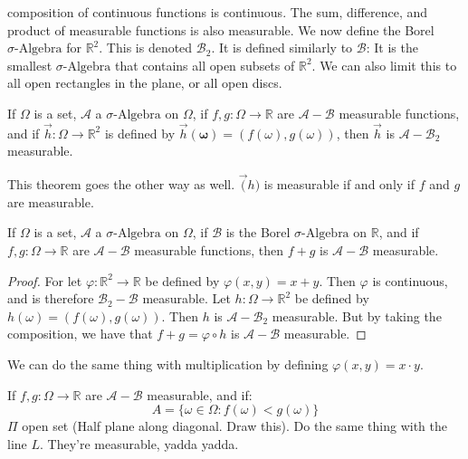         composition of continuous functions is continuous. The sum,
        difference, and product of measurable functions is also
        measurable. We now define the Borel $\sigma\text{-Algebra}$ for
        $\mathbb{R}^{2}$. This is denoted $\mathcal{B}_{2}$. It is
        defined similarly to $\mathcal{B}$: It is the smallest
        $\sigma\text{-Algebra}$ that contains all open subsets of
        $\mathbb{R}^{2}$. We can also limit this to all open rectangles
        in the plane, or all open discs.
        \begin{theorem}
            If $\Omega$ is a set, $\mathcal{A}$ a $\sigma\text{-Algebra}$
            on $\Omega$, if $f,g:\Omega\rightarrow\mathbb{R}$ are
            $\mathcal{A}-\mathcal{B}$ measurable functions, and if
            $\vec{h}:\Omega\rightarrow\mathbb{R}^{2}$ is defined by
            $\vec{h}(\boldsymbol{\omega})=(f(\omega),g(\omega))$,
            then $\vec{h}$ is $\mathcal{A}-\mathcal{B}_{2}$ measurable.
        \end{theorem}
        This theorem goes the other way as well. $\vec(h)$ is
        measurable if and only if $f$ and $g$ are measurable.
        \begin{theorem}
            If $\Omega$ is a set, $\mathcal{A}$ a $\sigma\text{-Algebra}$
            on $\Omega$, if $\mathcal{B}$ is the Borel
            $\sigma\text{-Algebra}$ on $\mathbb{R}$, and if
            $f,g:\Omega\rightarrow\mathbb{R}$ are
            $\mathcal{A}-\mathcal{B}$ measurable functions, then
            $f+g$ is $\mathcal{A}-\mathcal{B}$ measurable.
        \end{theorem}
        \begin{proof}
            For let $\varphi:\mathbb{R}^{2}\rightarrow\mathbb{R}$
            be defined by $\varphi(x,y)=x+y$. Then
            $\varphi$ is continuous, and is therefore
            $\mathcal{B}_{2}-\mathcal{B}$ measurable. Let
            $h:\Omega\rightarrow\mathbb{R}^{2}$ be defined by
            $h(\omega)=(f(\omega),g(\omega))$. Then $h$ is
            $\mathcal{A}-\mathcal{B}_{2}$ measurable. But by taking
            the composition, we have that
            $f+g=\varphi\circ{h}$ is $\mathcal{A}-\mathcal{B}$ measurable.
        \end{proof}
        We can do the same thing with multiplication by defining
        $\varphi(x,y)=x\cdot{y}$.
        \begin{theorem}
            If $f,g:\Omega\rightarrow\mathbb{R}$ are
            $\mathcal{A}-\mathcal{B}$ measurable, and if:
            \begin{equation}
                A=\{\omega\in\Omega:f(\omega)<g(\omega)\}
            \end{equation}
            $\Pi$ open set (Half plane along diagonal. Draw this).
            Do the same thing with the line $L$. They're measurable,
            yadda yadda.
        \end{theorem}
